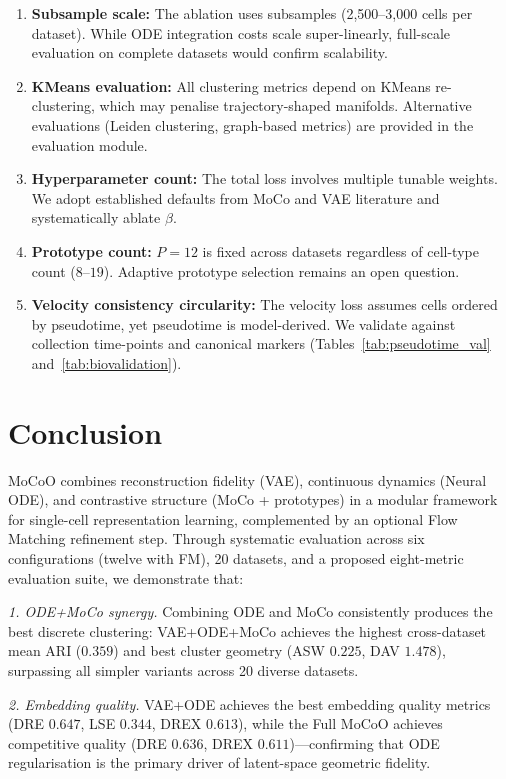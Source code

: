\documentclass[biology,article,submit,pdftex]{Definitions/mdpi}
\begin{document}
\begin{enumerate}
    \item \textbf{Subsample scale:} The ablation uses subsamples (2{,}500--3{,}000 cells per dataset). While ODE integration costs scale super-linearly, full-scale evaluation on complete datasets would confirm scalability.
    \item \textbf{KMeans evaluation:} All clustering metrics depend on KMeans re-clustering, which may penalise trajectory-shaped manifolds. Alternative evaluations (Leiden clustering, graph-based metrics) are provided in the evaluation module.
    \item \textbf{Hyperparameter count:} The total loss involves multiple tunable weights. We adopt established defaults from MoCo and VAE literature and systematically ablate $\beta$.
    \item \textbf{Prototype count:} $P{=}12$ is fixed across datasets regardless of cell-type count ($8$--$19$). Adaptive prototype selection remains an open question.
    \item \textbf{Velocity consistency circularity:} The velocity loss assumes cells ordered by pseudotime, yet pseudotime is model-derived. We validate against collection time-points and canonical markers (Tables~\ref{tab:pseudotime_val} and~\ref{tab:biovalidation}).
\end{enumerate}

\section{Conclusion}
\label{sec:conclusion}

MoCoO combines reconstruction fidelity (VAE), continuous dynamics (Neural ODE), and contrastive structure (MoCo + prototypes) in a modular framework for single-cell representation learning, complemented by an optional Flow Matching refinement step. Through systematic evaluation across six configurations (twelve with FM), 20 datasets, and a proposed eight-metric evaluation suite, we demonstrate that:

\textit{1. ODE+MoCo synergy.} Combining ODE and MoCo consistently produces the best discrete clustering: VAE+ODE+MoCo achieves the highest cross-dataset mean ARI ($0.359$) and best cluster geometry (ASW $0.225$, DAV $1.478$), surpassing all simpler variants across 20 diverse datasets.

\textit{2. Embedding quality.} VAE+ODE achieves the best embedding quality metrics (DRE $0.647$, LSE $0.344$, DREX $0.613$), while the Full MoCoO achieves competitive quality (DRE $0.636$, DREX $0.611$)---confirming that ODE regularisation is the primary driver of latent-space geometric fidelity.
\end{document}
